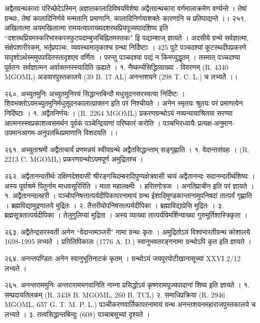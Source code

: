 अद्वैतग्रन्थकाराः
परिच्छेदेऽस्मिन् अज्ञातकालादिविषयविशेषा अद्वैतग्रन्थकारा वर्णमालाक्रमेण वर्ण्यन्ते । तेषां ग्रन्थाः, तेषां कालादिनिर्णये मन्मतानि प्रमाणानि, कालादिनिर्णयाशक्तेः कारणानि च प्रतिपाद्यन्ते ।।
२५९. अखिलात्मा
अयमखिलात्मा रामयत्यपराख्यदशरथप्रियपूज्यपादशिष्य इति ``दशरथप्रियमस्करिभास्करस्फुटपदाम्बुजचिह्नितमस्तकः" इि पद्याम्शाज् ज्ञायते । अदसीये ग्रन्थे सर्वज्ञात्मा, संक्षेपशारीरकम्, भर्तृप्रपञ्चः, व्यवस्थामातृकाश्च ग्रन्था निर्दिष्टाः । 425 पुटे पञ्चदश्यां कूटस्थदीपप्रकरणे यादृशोऽर्थस्ममुपपादितस्तादृशएव वर्णितः । परन्तु पञ्चदश्या पद्यं न किमप्युद्धृतम् । तस्मात् पञ्चदश्या पूर्वतनः सर्वज्ञात्मन अर्वाक्तनस्स्यादिति ऊह्यते ।
१. नैष्कर्म्यसिद्धिव्याख्या - विवरणम् (R. 4340 MGOML) अडयारपुस्तकालये (39 B. 17 AL) अनन्तशयने (298 T. C. L.) च लभ्यतेे ।।

२६०. अच्युतमुनिः
अच्युतमुनिरयं सिद्धान्तबिन्दौ मधुसूदनसरस्वत्या निर्दिष्टः । शिवभक्तोऽयमच्युतमुनिर्मधुसूदनकालात्प्राक्तन इति परं निश्चीयते । अनेन स्मृतयः श्रुतयः परं प्रमाणत्वेन निर्दिष्टाः ।
१. अद्वैतनिर्णयः । (R. 2264 MGOML)
प्रकरणग्रन्थोऽयं नव्यन्यायाश्रितया सरण्या आत्मनस्स्वप्रकाशत्वसमर्थन पूर्वकं पञ्चेन्द्रियाणां परिष्कारं करोति । पञ्चभिरध्यायैः प्रत्यक्ष-अनुमान-उपमानआगम-अनुपलब्धिप्रमाणानि विशदयति ।।

२६१. अच्युताश्रमी 
अद्वैताचार्यं प्रणमन्नयं स्वीयग्रन्थे अद्वैतसिद्धान्ताम् सङ्गृह्णाति ।
१. वेदान्तसंग्रहः । (R. 2213 C. MGOML) प्रकरणग्रन्थोऽयमपूर्ण अमुद्रितश्च ।

२६२. अद्वैतानन्दतीर्थः
दक्षिणदेशवासी श्रीरङ्गचिदम्बरादिपुण्यक्षेत्रवासी चायं अद्वैतानन्दः सदानन्दतीर्थशिष्यः । अस्य पूर्वाश्रमे पितुर्नाम माधवसूरिरिति । माता महालक्ष्मीः । हरितगोत्रजः । अनतिप्राचीन इति परं ज्ञायते ।
१. अद्वैतानन्दलहरी । पञ्चोपनिषत्तात्पर्यदीपिकापरनामायं ग्रन्थ ईशादिमुण्डकान्तानामुपनिषदां तात्पर्यं गृह्णाति । ब्रह्मविद्यामुद्रणालये मुद्रितः ।
२. तैत्तरीयोपनिषत्तात्पर्यदीपिका । ब्रह्माविद्याप्रेसि मुद्रितः ।
३. ब्रह्मसूत्रतात्पर्यदीपिका । तेलुगुलिप्यां मुद्रिता । अस्य व्याख्या तात्पर्यविमर्शिन्याख्या गुरुमूर्तिशास्त्रिकृता ।

२६३. अद्वैतेन्द्रसरस्वती
अनेन ``वेदान्तमञ्जरी" नामा ग्रन्थः कृतः । अमुद्रितोऽयं विश्वभारतीग्रन्थ कोशालये 1698-1995 लभ्यते । प्रतिलिपिकालः (1776 A. D.) स्वानुभवतरङ्गनामा ग्रन्थोऽपि कृत इति ज्ञायते ।

२६४. अनन्तपण्डितः 
अनेन स्वानुभूतिनाटकं कृतम् । ग्रन्थोऽयं जयपुरपोटीखानासूच्यां XXVI 2/12 लभ्यते ।

२६५. अनन्तराममुनिः
अन्तरारामभगवानिति नाम्ना प्रसिद्धोऽयं कृष्णरामपूज्यपादानां शिष्य इति ज्ञायते ।
१. सम्प्रदायतिलकम् (R. 3438 B. MGOML, 260 B. TCL)
२. समाधिप्रक्रिया (R. 2946 MGOML, 657 G. T. M. P. L.)
पञ्चीकरणवार्तिकापरनामायं ग्रन्थ अनन्तशयनमहाराजपुस्तकालये च लभ्यते ।
३. तत्वसिद्धान्तबिन्दुः (608) पञ्चाबसूच्यां दृश्यते ।

